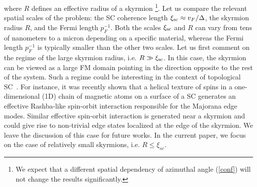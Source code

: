 \documentclass[twocolumn,showpacs,floatfix,longbibliography]{revtex4-1}
\begin{document}
where $R$ defines an effective radius of a skyrmion \footnote{We expect that a different spatial dependency of azimuthal angle (\ref{conf}) will not change the results significantly.}. Let us compare the relevant spatial scales of the problem: the SC coherence length $\xi_{\rm sc} \approx v_F/\Delta$, the skyrmion radius $R$, and the Fermi length $p_F^{-1}$. Both the scales $\xi_{\rm sc}$ and $R$ can vary from tens of nanometers to a micron depending on a specific material, whereas the Fermi length $p_F^{-1}$ is typically smaller than the other two scales. Let us first comment on the regime of the large skyrmion radius, i.e. $R\gg \xi_{\rm sc}$. In this case, the skyrmion can be viewed as a large FM domain pointing in the direction opposite to the rest of the system. Such a regime could be interesting in the context of topological SC~\cite{Alicea2012}. For instance, it was recently shown \cite{Klinovaja2013} that a helical texture of spins in a one-dimensional (1D) chain of magnetic atoms on a surface of a SC generates an effective Rashba-like spin-orbit interaction responsible for the Majorana edge modes. Similar effective spin-orbit interaction is generated near a skyrmion and could give rise to non-trivial edge states localized at the edge of the skyrmion. We leave the discussion of this  case for future works. In the current paper, we focus on the case of relatively small skyrmions, i.e. $R\le \xi_{sc}$.
\end{document}
